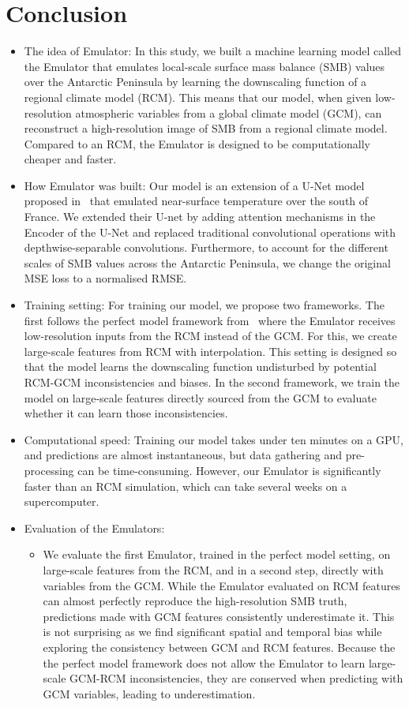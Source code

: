 \documentclass[a4paper,11pt,oneside]{report}
\begin{document}
\chapter{Conclusion}
\begin{itemize}
    \item The idea of Emulator: In this study, we built a machine learning model called the Emulator that emulates local-scale surface mass balance (SMB) values over the Antarctic Peninsula by learning the downscaling function of a regional climate model (RCM). This means that our model, when given low-resolution atmospheric variables from a global climate model (GCM), can reconstruct a high-resolution image of SMB from a regional climate model. Compared to an RCM, the Emulator is designed to be computationally cheaper and faster.   
    \item How Emulator was built: Our model is an extension of a U-Net model proposed in~\cite{Doury} that emulated near-surface temperature over the south of France. We extended their U-net by adding attention mechanisms in the Encoder of the U-Net and replaced traditional convolutional operations with depthwise-separable convolutions. Furthermore, to account for the different scales of SMB values across the Antarctic Peninsula, we change the original MSE loss to a normalised RMSE. 
    \item Training setting: For training our model, we propose two frameworks. The first follows the perfect model framework from~\cite{Doury} where the Emulator receives low-resolution inputs from the RCM instead of the GCM. For this, we create large-scale features from RCM with interpolation. This setting is designed so that the model learns the downscaling function undisturbed by potential RCM-GCM inconsistencies and biases. In the second framework, we train the model on large-scale features directly sourced from the GCM to evaluate whether it can learn those inconsistencies. 
    \item Computational speed: Training our model takes under ten minutes on a GPU, and predictions are almost instantaneous, but data gathering and pre-processing can be time-consuming. However, our Emulator is significantly faster than an RCM simulation, which can take several weeks on a supercomputer. 
    \item Evaluation of the Emulators:
    \begin{itemize}
        \item We evaluate the first Emulator, trained in the perfect model setting, on large-scale features from the RCM, and in a second step, directly with variables from the GCM. While the Emulator evaluated on RCM features can almost perfectly reproduce the high-resolution SMB truth, predictions made with GCM features consistently underestimate it. This is not surprising as we find significant spatial and temporal bias while exploring the consistency between GCM and RCM features. Because the the perfect model framework does not allow the Emulator to learn large-scale GCM-RCM inconsistencies, they are conserved when predicting with GCM variables, leading to underestimation. 

\end{itemize}
\end{itemize}
\end{document}
